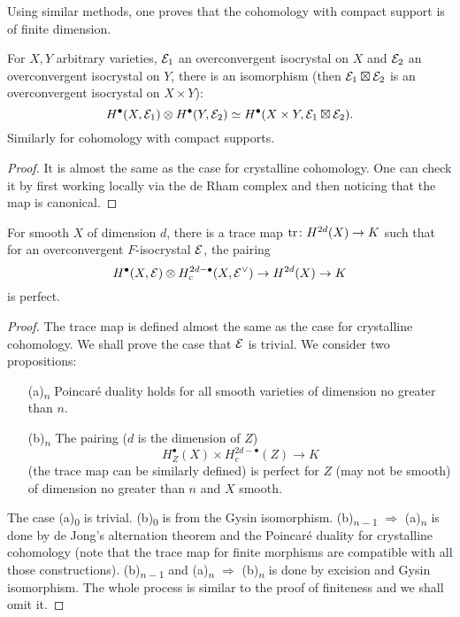 Using similar methods, one proves that 
the cohomology with compact support is of finite dimension.
\begin{theorem}
    For $X,Y$ arbitrary varieties, ${\mathcal {E}}_1$ an overconvergent isocrystal on $X$ 
    and ${\mathcal {E}}_2$ an overconvergent isocrystal on $Y$, 
    there is an isomorphism 
    (then ${\mathcal {E}}_1 \boxtimes {\mathcal {E}}_2$ is an overconvergent isocrystal on $X \times Y$):
    \[
        H^\bullet(X, {\mathcal {E}}_1) \otimes H^\bullet(Y, {\mathcal {E}}_2) \simeq H^\bullet(X \times Y, {\mathcal {E}}_1 \boxtimes {\mathcal {E}}_2).
    \]
    Similarly for cohomology with compact supports.
\end{theorem}

\begin{proof}
    It is almost the same as the case for crystalline cohomology. 
    One can check it by first working locally 
    via the de Rham complex and then noticing that the map is canonical. 
\end{proof}

\begin{theorem}
    For smooth $X$ of dimension $d$, 
    there is a trace map $\operatorname{tr} \colon H^{2d}(X) \to K$ such that 
    for an overconvergent $F$-isocrystal ${\mathcal {E}}$, the pairing
    \[
        H^\bullet(X, {\mathcal {E}}) \otimes H^{2d-\bullet}_c(X, {\mathcal {E}}^\vee) \to H^{2d}(X) \to K
    \]
    is perfect.
\end{theorem}

\begin{proof}
    The trace map is defined almost the same as the case for crystalline cohomology. 
    We shall prove the case that ${\mathcal {E}}$ is trivial. We consider two propositions:
    \begin{itemize}
        \item [(a)\textsubscript{$n$}] 
            Poincar\'e duality holds 
            for all smooth varieties of dimension no greater than $n$.
        \item [(b)\textsubscript{$n$}] 
            The pairing ($d$ is the dimension of $Z$)
            \[
                H^\bullet_Z(X) \times H^{2d-\bullet}_c(Z) \to K
            \] 
            (the trace map can be similarly defined) is perfect 
            for $Z$ (may not be smooth) of dimension no greater than $n$ and $X$ smooth.
    \end{itemize}
    The case (a)\textsubscript{$0$} is trivial. 
    (b)\textsubscript{$0$} is from the Gysin isomorphism. 
    (b)\textsubscript{$n-1$} $\Rightarrow$ (a)\textsubscript{$n$} is done 
    by de Jong's alternation theorem 
    and the Poincar\'e duality for crystalline cohomology 
    (note that the trace map for finite morphisms are compatible with all those constructions). 
    (b)\textsubscript{$n-1$} and 
    (a)\textsubscript{$n$} $\Rightarrow$ (b)\textsubscript{$n$} is done 
    by excision and Gysin isomorphism. 
    The whole process is similar to the proof of finiteness and we shall omit it.
\end{proof}

